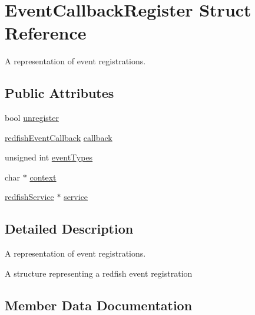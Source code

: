 \hypertarget{structEventCallbackRegister}{}\section{Event\+Callback\+Register Struct Reference}
\label{structEventCallbackRegister}


A representation of event registrations.  


\subsection*{Public Attributes}
\begin{DoxyCompactItemize}
\item 
bool \hyperlink{structEventCallbackRegister_a0daf5de835ad6515d1fb180f1bbaa91e}{unregister}
\item 
\hyperlink{redfishService_8h_a758b03d26a0d4f87974b4e16fbd833e8}{redfish\+Event\+Callback} \hyperlink{structEventCallbackRegister_a68129e68a1f8fa73e3c675594a3f1f89}{callback}
\item 
unsigned int \hyperlink{structEventCallbackRegister_aae27b426e376de0eba9b424dede08e60}{event\+Types}
\item 
char $\ast$ \hyperlink{structEventCallbackRegister_a7e1b05f5578cba8db9ba6335bc9794e6}{context}
\item 
\hyperlink{redfishService_8h_a4c9115c0f0a21de971c0dfae06f26372}{redfish\+Service} $\ast$ \hyperlink{structEventCallbackRegister_aa6b4bd76f3f3b6370867148e0ba47ec2}{service}
\end{DoxyCompactItemize}


\subsection{Detailed Description}
A representation of event registrations. 

A structure representing a redfish event registration 

\subsection{Member Data Documentation}
\mbox{\label{structEventCallbackRegister_a68129e68a1f8fa73e3c675594a3f1f89}} 
